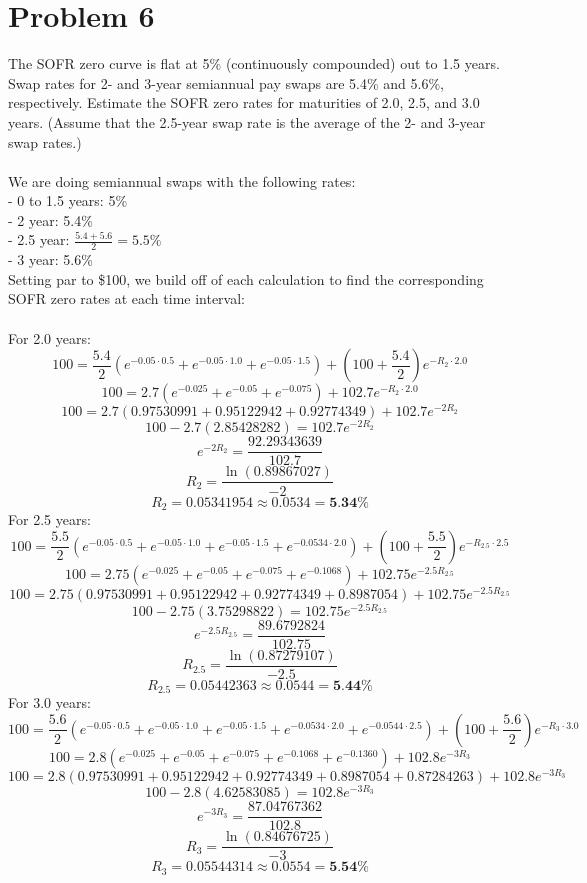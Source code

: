 \documentclass{article}
\begin{document}
{\Large 

\section*{Problem 6}
The SOFR zero curve is flat at 5\% (continuously compounded) out to 1.5 years. Swap rates for 2- and 3-year semiannual pay swaps are 5.4\% and 5.6\%, respectively. Estimate the SOFR zero rates for maturities of 2.0, 2.5, and 3.0 years. (Assume that the 2.5-year swap rate is the average of the 2- and 3-year swap rates.) \\ \\
We are doing semiannual swaps with the following rates: \\
- 0 to 1.5 years: 5\% \\
- 2 year: 5.4\% \\
- 2.5 year: \(\frac{5.4 + 5.6}{2} = 5.5\%\) \\
- 3 year: 5.6\% \\
Setting par to \$100, we build off of each calculation to find the corresponding SOFR zero rates at each time interval: \\ \\
For 2.0 years:
\[
  100 = \frac{5.4}{2}(e^{-0.05 \cdot 0.5} + e^{-0.05 \cdot 1.0} + e^{-0.05 \cdot 1.5}) + (100 + \frac{5.4}{2})e^{-R_2 \cdot 2.0}
\]
\[
  100 = 2.7(e^{-0.025} + e^{-0.05} + e^{-0.075}) + 102.7e^{-R_2 \cdot 2.0}
\]
\[
  100 = 2.7(0.97530991 + 0.95122942 + 0.92774349) + 102.7e^{-2R_2}
\]
\[
  100 - 2.7(2.85428282) = 102.7e^{-2R_2}
\]
\[
  e^{-2R_2} = \frac{92.29343639}{102.7}
\]
\[
  R_2 = \frac{\ln(0.89867027)}{-2}
\]
\[
  R_2 = 0.05341954 \approx 0.0534 = \boxed{\textbf{5.34\%}}
\]
For 2.5 years: 
\[
  100 = \frac{5.5}{2}(e^{-0.05 \cdot 0.5} + e^{-0.05 \cdot 1.0} + e^{-0.05 \cdot 1.5} + e^{-0.0534 \cdot 2.0}) + (100 + \frac{5.5}{2})e^{-R_{2.5} \cdot 2.5}
\]
\[
  100 = 2.75(e^{-0.025} + e^{-0.05} + e^{-0.075} + e^{-0.1068}) + 102.75e^{-2.5R_{2.5}}
\]
\[
  100 = 2.75(0.97530991 + 0.95122942 + 0.92774349 + 0.8987054) + 102.75e^{-2.5R_{2.5}}
\]
\[
  100 - 2.75(3.75298822) = 102.75e^{-2.5R_{2.5}}
\]
\[
  e^{-2.5R_{2.5}} = \frac{89.6792824}{102.75}
\]
\[
  R_{2.5} = \frac{\ln(0.87279107)}{-2.5}
\]
\[
  R_{2.5} = 0.05442363 \approx 0.0544 = \boxed{\textbf{5.44\%}}
\]
For 3.0 years:
\[
  100 = \frac{5.6}{2}(e^{-0.05 \cdot 0.5} + e^{-0.05 \cdot 1.0} + e^{-0.05 \cdot 1.5} + e^{-0.0534 \cdot 2.0} + e^{-0.0544 \cdot 2.5}) + (100 + \frac{5.6}{2})e^{-R_{3} \cdot 3.0}
\]
\[
  100 = 2.8(e^{-0.025} + e^{-0.05} + e^{-0.075} + e^{-0.1068} + e^{-0.1360}) + 102.8e^{-3R_{3}}
\]
\[
  100 = 2.8(0.97530991 + 0.95122942 + 0.92774349 + 0.8987054 + 0.87284263) + 102.8e^{-3R_{3}}
\]
\[
  100 - 2.8(4.62583085) = 102.8e^{-3R_{3}}
\]
\[
  e^{-3R_3} = \frac{87.04767362}{102.8}
\]
\[
  R_3 = \frac{\ln(0.84676725)}{-3}
\]
\[
  R_3 = 0.05544314 \approx 0.0554 = \boxed{\textbf{5.54\%}}
\]

}
\end{document}
